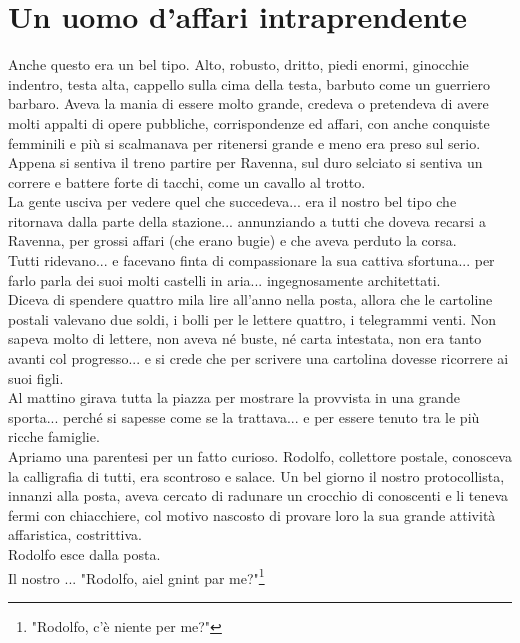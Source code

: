 \documentclass[10pt]{memoir} %
\begin{document}
\chapter{Un uomo d'affari intraprendente}
Anche questo era un bel tipo. Alto, robusto, dritto, piedi enormi, ginocchie indentro, testa alta, cappello sulla cima della testa, barbuto come un guerriero barbaro. Aveva la mania di essere molto grande, credeva o pretendeva di avere molti appalti di opere pubbliche, corrispondenze ed affari, con anche conquiste femminili e più si scalmanava per ritenersi grande e meno era preso sul serio.\\
Appena si sentiva il treno partire per Ravenna, sul duro selciato si sentiva un correre e battere forte di tacchi, come un cavallo al trotto.\\
La gente usciva per vedere quel che succedeva... era il nostro bel tipo che ritornava dalla parte della stazione... annunziando a tutti che doveva recarsi a Ravenna, per grossi affari (che erano bugie) e che aveva perduto la corsa.\\
Tutti ridevano... e facevano finta di compassionare la sua cattiva sfortuna... per farlo parla dei suoi molti castelli in aria... ingegnosamente architettati.\\
Diceva di spendere quattro mila lire all'anno nella posta, allora che le cartoline postali valevano due soldi, i bolli per le lettere quattro, i telegrammi venti. Non sapeva molto di lettere, non aveva né buste, né carta intestata, non era tanto avanti col progresso... e si crede che per scrivere una cartolina dovesse ricorrere ai suoi figli. \\
Al mattino girava tutta la piazza per mostrare la provvista in una grande sporta... perché si sapesse come se la trattava... e per essere tenuto tra le più ricche famiglie.\\
Apriamo una parentesi per un fatto curioso. Rodolfo, collettore postale, conosceva la calligrafia di tutti, era scontroso e salace. Un bel giorno il nostro protocollista, innanzi alla posta, aveva cercato di radunare un crocchio di conoscenti e li teneva fermi con chiacchiere, col motivo nascosto di provare loro la sua grande attività affaristica, costrittiva. \\
Rodolfo esce dalla posta.\\
Il nostro .\:.\:.\: "Rodolfo, aiel gnint par me?"\footnote{"Rodolfo, c'è niente per me?"}\\
\end{document}
